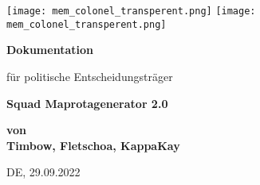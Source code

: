 \begin{titlepage}

    \texttt{[image: mem\_colonel\_transperent.png]}
    \hfill
    \texttt{[image: mem\_colonel\_transperent.png]}

    \begin{center}
        \vspace*{1cm}
        \Large
        \textbf{Dokumentation}

        \vspace*{0.5cm}
        \normalsize
        für politische Entscheidungsträger

        \vspace*{1cm}
        \huge
        \textbf{Squad Maprotagenerator 2.0}\\
        \vspace{0.5cm}
        

        \vspace{1.5cm}
        \Large
        \textbf{von}\\
        \textbf{Timbow, Fletschoa, KappaKay}

        \vspace{0.5cm}
        \normalsize

        \vspace{2cm}
        DE, 29.09.2022

        \vspace{1.3cm}

        \begin{tabular}{ccc}
             
        \end{tabular}
    \end{center}
\end{titlepage}